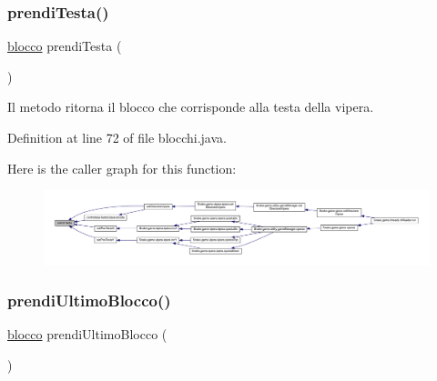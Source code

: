 \subsubsection{\texorpdfstring{prendi\+Testa()}{prendiTesta()}}
{\footnotesize\ttfamily \mbox{\hyperlink{class_snake_1_1game_1_1vipera_1_1blocco}{blocco}} prendi\+Testa (\begin{DoxyParamCaption}{ }\end{DoxyParamCaption})\hspace{0.3cm}{\ttfamily [private]}}



Il metodo ritorna il blocco che corrisponde alla testa della vipera. 



Definition at line 72 of file blocchi.\+java.

Here is the caller graph for this function\+:
\nopagebreak
\begin{figure}[H]
\begin{center}
\leavevmode
\includegraphics[width=350pt]{class_snake_1_1game_1_1vipera_1_1blocchi_a0479241855807563d1a7ed14bb5210cd_icgraph}
\end{center}
\end{figure}
\mbox{\label{class_snake_1_1game_1_1vipera_1_1blocchi_a31739bbc3222c3434ef9b45756523574}} 
\subsubsection{\texorpdfstring{prendi\+Ultimo\+Blocco()}{prendiUltimoBlocco()}}
{\footnotesize\ttfamily \mbox{\hyperlink{class_snake_1_1game_1_1vipera_1_1blocco}{blocco}} prendi\+Ultimo\+Blocco (\begin{DoxyParamCaption}{ }\end{DoxyParamCaption})\hspace{0.3cm}{\ttfamily [private]}}



